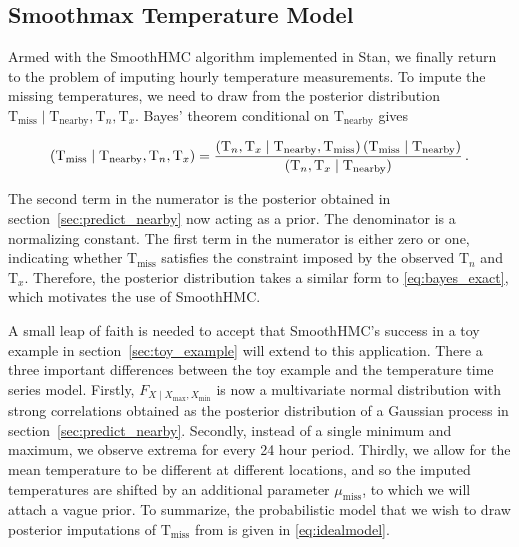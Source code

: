 \documentclass[letter]{article}
\newcommand{\genericdel}[3]{%
      \left#1#3\right#2
    }
\newcommand{\del}[1]{\genericdel(){#1}}
\let\Pr\relax
\DeclareMathOperator{\Pr}{\mathbb{P}}
\newcommand{\T}{\mathrm{T}}
\newcommand{\Tn}{\T_{n}}
\newcommand{\Tx}{\T_{x}}
\newcommand{\miss}{\mathrm{miss}}
\newcommand{\obs}{\mathrm{nearby}}
\newcommand{\Xmax}{X_{\max}}
\newcommand{\Xmin}{X_{\min}}
\newcommand{\Fcond}{F_{X \mid \Xmax,\Xmin}}
\begin{document}
        \subsection{Smoothmax Temperature Model}\label{smoothmax-temperature-model}
    


        Armed with the SmoothHMC algorithm implemented in Stan, we finally return to the problem of imputing hourly temperature measurements.
To impute the missing temperatures, we need to draw from the posterior distribution \(\T_\miss \mid \T_\obs, \Tn, \Tx\).
Bayes' theorem conditional on \(\T_\obs\) gives

\begin{equation}
    \Pr\del{\T_\miss \mid \T_\obs, \Tn, \Tx} = \frac{
        \Pr\del{\Tn, \Tx \mid \T_\obs, \T_\miss } 
        \Pr\del{\T_\miss \mid \T_\obs}
        }{
        \Pr\del{\Tn, \Tx \mid \T_\obs}
        }\,.
\end{equation}

The second term in the numerator is the posterior obtained in section~\ref{sec:predict_nearby} now acting as a prior.
The denominator is a normalizing constant.
The first term in the numerator is either zero or one, indicating whether \(\T_\miss\) satisfies the constraint imposed by the observed \(\Tn\) and \(\Tx\).
Therefore, the posterior distribution takes a similar form to \eqref{eq:bayes_exact}, which motivates the use of SmoothHMC.
    


        A small leap of faith is needed to accept that SmoothHMC's success in a toy example in section~\ref{sec:toy_example} will extend to this application.
There a three important differences between the toy example and the temperature time series model.
Firstly, \(\Fcond\) is now a multivariate normal distribution with strong correlations obtained as the posterior distribution of a Gaussian process in section~\ref{sec:predict_nearby}.
Secondly, instead of a single minimum and maximum, we observe extrema for every 24 hour period.
Thirdly, we allow for the mean temperature to be different at different locations,
and so the imputed temperatures are shifted by an additional parameter \(\mu_{\miss}\),
to which we will attach a vague prior.
To summarize, the probabilistic model that we wish to draw posterior imputations of \(\T_\miss\) from is given in \eqref{eq:idealmodel}.
\end{document}

